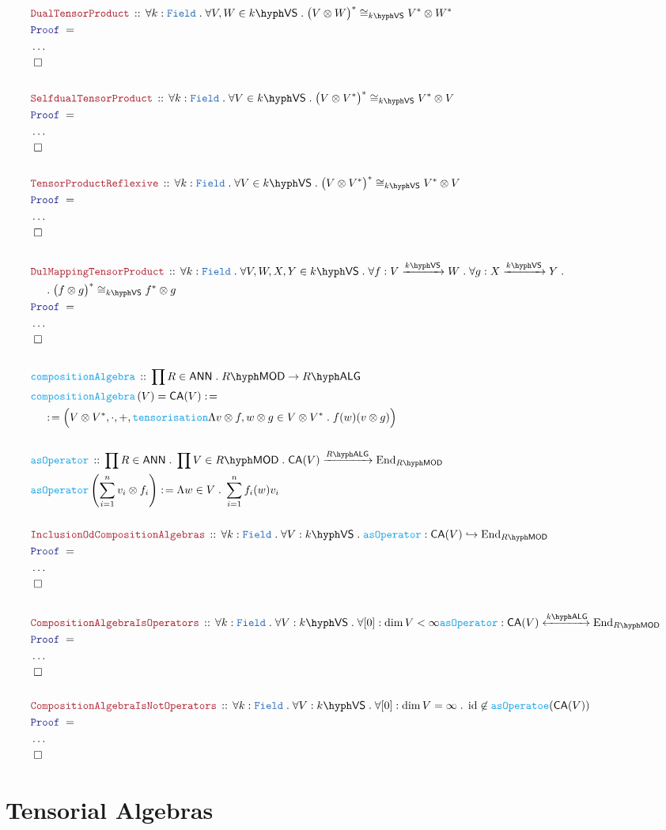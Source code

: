 \documentclass[12pt]{scrartcl}%
\newcommand{\TYPE}[1]{\textcolor{NavyBlue}{\mathtt{#1}}}%
\newcommand{\FUNC}[1]{\textcolor{Cerulean}{\mathtt{#1}}}%
\newcommand{\LOGIC}[1]{\textcolor{Blue}{\mathtt{#1}}}%
\newcommand{\THM}[1]{\textcolor{Maroon}{\mathtt{#1}}}%
\renewcommand{\.}{\; . \;} %
\newcommand{\de}{: \kern 0.1pc =} %
\newcommand{\Act}[1]{\left( #1 \right)} %
\newcommand{\Theorem}[2]{& \THM{#1} \, :: \, #2 \\ & \Proof = \\ } %
\newcommand{\DeclareFunc}[2]{& \FUNC{#1} \, :: \, #2 \\}%
\newcommand{\DefineFunc}[3]{&  \FUNC{#1}\Act{#2} \de #3 \\}%
\newcommand{\DefineNamedFunc}[4]{&  \FUNC{#1}\Act{#2} = #3 \de #4 \\}%
\newcommand{\NewLine}{\\ & \kern 1pc}%
\newcommand{\Page}[1]{ \begin{align*} #1 \end{align*}  }%
\newcommand{\NoProof}{ & \ldots \\ \EndProof}%
\DeclareMathOperator*{\id}{id}%
\newcommand{\End}{\mathrm{End}}%
\newcommand{\ToInj}{\hookrightarrow} %
\newcommand{\QED}{\; \square} %
\newcommand{\EndProof}{& \QED \\} %
\newcommand{\Proof}{\LOGIC{Proof} \; } %
\newcommand{\Arrow}[1]{\xrightarrow{#1}}%
\newcommand{\ToIso}[1]{\xleftrightarrow{#1}}%
\newcommand{\VS}[1]{#1\hyph\mathsf{VS}} %
\newcommand{\LMOD}[1]{#1\hyph\mathsf{MOD}} %
\newcommand{\Field}{\TYPE{Field}}
\newcommand{\ANN}{\mathsf{ANN}} %
\newcommand{\LALG}[1]{#1\hyph\mathsf{ALG}}%
\begin{document}
\Page{
	\Theorem{DualTensorProduct}
	{
		\forall k : \Field \.
		\forall V,W \in \VS{k} \.
		\big(V \otimes W\big)^* \cong_{\VS{k}} V^* \otimes W^*
	}
	\NoProof
	\\
	\Theorem{SelfdualTensorProduct}
	{
		\forall k : \Field \.
		\forall V \in \VS{k} \.
		\big(V \otimes V^*\big)^* \cong_{\VS{k}} V^* \otimes V
	}
	\NoProof
	\\
	\Theorem{TensorProductReflexive}
	{
		\forall k : \Field \.
		\forall V \in \VS{k} \.
		\big(V \otimes V^*\big)^* \cong_{\VS{k}} V^* \otimes V
	}
	\NoProof
	\\
	\Theorem{DulMappingTensorProduct}
	{
		\forall k : \Field \.
		\forall V,W,X,Y \in \VS{k} \.
		\forall f : V \Arrow{\VS{k}} W \.
		\forall g : X \Arrow{\VS{k}} Y \. \NewLine \. 
		\big(f \otimes g\big)^* \cong_{\VS{k}} f^* \otimes g
	}
	\NoProof
	\\
	\DeclareFunc{compositionAlgebra}{\prod R \in \ANN \. \LMOD{R} \to \LALG{R}}
	\DefineNamedFunc{compositionAlgebra}{V}{\mathsf{CA}(V)}
	{\NewLine \de\Big(V \otimes V^*,\cdot,+, \FUNC{tensorisation}\Lambda v \otimes f, w \otimes g \in V \otimes V^* \. f(w) (v \otimes g) \Big)}
	\\
	\DeclareFunc{asOperator}{\prod R \in \ANN \. \prod V \in \LMOD{R} \. \mathsf{CA}(V) \Arrow{\LALG{R}} \End_{\LMOD{R}} }
	\DefineFunc{asOperator}{\sum^n_{i=1} v_i \otimes f_i}{\Lambda w \in V \. \sum^n_{i=1} f_i(w)v_i}
	\\
	\Theorem{InclusionOdCompositionAlgebras}{\forall k : \Field  \. \forall V : \VS{k} \. \FUNC{asOperator} : \mathsf{CA}(V) \ToInj \End_{\LMOD{R}}}
	\NoProof
	\\
	\Theorem{CompositionAlgebraIsOperators}{
		\forall k : \Field  \. 
		\forall V : \VS{k} \. 
		\forall [0] : \dim V < \infty
		\FUNC{asOperator} : \mathsf{CA}(V) \ToIso{\LALG{k}} \End_{\LMOD{R}}
		}
	\NoProof
	\\
	\Theorem{CompositionAlgebraIsNotOperators}{
		\forall k : \Field  \. 
		\forall V : \VS{k} \. 
		\forall [0] : \dim V = \infty \. 
		\id \not \in \FUNC{asOperatoe}(\mathsf{CA}(V))
		}
	\NoProof
}
\newpage
\section{Tensorial Algebras}
\end{document}
